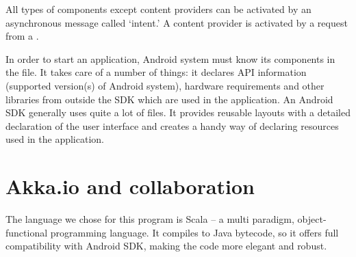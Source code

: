 All types of components except content providers can be activated by an asynchronous message called `intent.' A content provider is activated by a request from a .

In order to start an application, Android system must know its components in the  file. It takes care of a number of things: it declares API information (supported version(s) of Android system), hardware requirements and other libraries from outside the SDK which are used in the application. An Android SDK generally uses quite a lot of  files. It provides reusable layouts with a detailed declaration of the user interface and creates a handy way of declaring resources used in the application.

\section{Akka.io and collaboration}
\label{lift}

The language we chose for this program is Scala -- a multi paradigm, object-functional programming language. It compiles to Java bytecode, so it offers full compatibility with Android SDK, making the code more elegant and robust.

